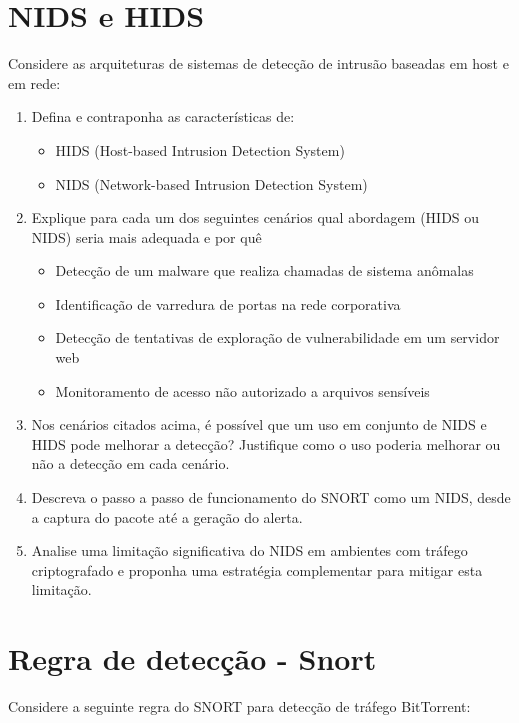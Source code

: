 \section{NIDS e HIDS}
Considere as arquiteturas de sistemas de detecção de intrusão baseadas em host e em rede:
\begin{enumerate}
    \item  Defina e contraponha as características de:
          \begin{itemize}
              \item     HIDS (Host-based Intrusion Detection System)

              \item   NIDS (Network-based Intrusion Detection System)
          \end{itemize}
    \item  Explique para cada um dos seguintes cenários qual abordagem (HIDS ou NIDS) seria mais adequada e por quê
          \begin{itemize}
              \item     Detecção de um malware que realiza chamadas de sistema anômalas

              \item       Identificação de varredura de portas na rede corporativa

              \item        Detecção de tentativas de exploração de vulnerabilidade em um servidor web

              \item       Monitoramento de acesso não autorizado a arquivos sensíveis
          \end{itemize}
    \item Nos cenários citados acima, é possível que um uso em conjunto de NIDS e HIDS pode melhorar a detecção? Justifique como o uso poderia melhorar ou não a detecção em cada cenário.
    \item  Descreva o passo a passo de funcionamento do SNORT como um NIDS, desde a captura do pacote até a geração do alerta.
    \item Analise uma limitação significativa do NIDS em ambientes com tráfego criptografado e proponha uma estratégia complementar para mitigar esta limitação.
\end{enumerate}


\section{Regra de detecção - Snort}
Considere a seguinte regra do SNORT para detecção de tráfego BitTorrent:

